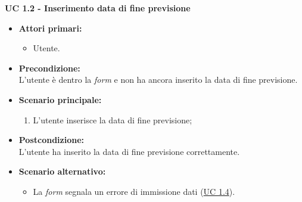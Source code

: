 \vspace{0.5cm}

\noindent \textbf{\large UC 1.2 - Inserimento data di fine previsione}
\label{uc:inserimento-data-fine-prev}
\begin{itemize}

	\item \textbf{Attori primari: }
		\begin{itemize}
			\item Utente.
		\end{itemize}

	\item \textbf{Precondizione: }\\[0.3cm]
		L'utente è dentro la \textit{form} e non ha ancora inserito la data di fine previsione.

	\item \textbf{Scenario principale: }
		\begin{enumerate}
			\item L'utente inserisce la data di fine previsione;
		\end{enumerate}

	\item \textbf{Postcondizione: }\\[0.3cm]
		L'utente ha inserito la data di fine previsione correttamente.

	\item \textbf{Scenario alternativo: }
		\begin{itemize}
		    \item La \textit{form} segnala un errore di immissione dati (\hyperref[uc:err-inserimento-data-fine-prev]{UC 1.4}).
		\end{itemize}

\end{itemize}

\vspace{0.5cm}

